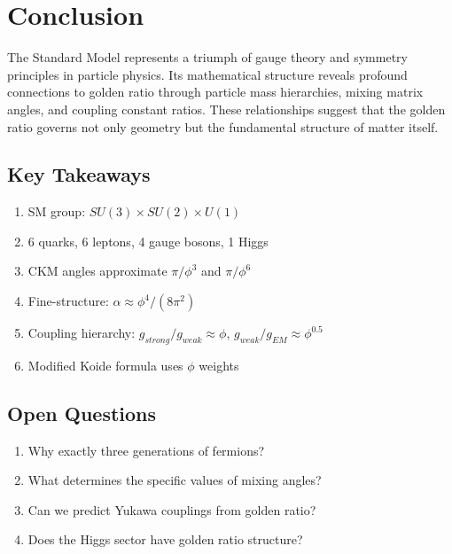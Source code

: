 \section{Conclusion}

The Standard Model represents a triumph of gauge theory and symmetry principles in particle physics. Its mathematical structure reveals profound connections to golden ratio through particle mass hierarchies, mixing matrix angles, and coupling constant ratios. These relationships suggest that the golden ratio governs not only geometry but the fundamental structure of matter itself.

\subsection*{Key Takeaways}

\begin{enumerate}
\item SM group: $SU(3) \times SU(2) \times U(1)$
\item 6 quarks, 6 leptons, 4 gauge bosons, 1 Higgs
\item CKM angles approximate $\pi/\phi^3$ and $\pi/\phi^6$
\item Fine-structure: $\alpha \approx \phi^4/(8\pi^2)$
\item Coupling hierarchy: $g_{strong}/g_{weak} \approx \phi$, $g_{weak}/g_{EM} \approx \phi^{0.5}$
\item Modified Koide formula uses $\phi$ weights
\end{enumerate}

\subsection*{Open Questions}

\begin{enumerate}
\item Why exactly three generations of fermions?
\item What determines the specific values of mixing angles?
\item Can we predict Yukawa couplings from golden ratio?
\item Does the Higgs sector have golden ratio structure?
\end{enumerate}



